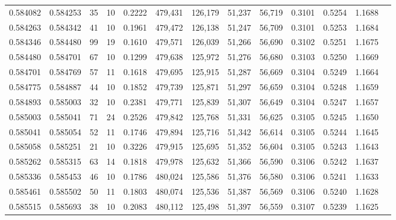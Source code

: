 \begin{tabular}{rrrrrrrrrrrrr}
0.584082 & 0.584253 &    35 &  10 &                                     0.2222 & 479,431 & 126,179 &  51,237 &  56,719 & 0.3101 & 0.5254 & 1.1688 \\
0.584263 & 0.584342 &    41 &  10 &                                     0.1961 & 479,472 & 126,138 &  51,247 &  56,709 & 0.3101 & 0.5253 & 1.1684 \\
0.584346 & 0.584480 &    99 &  19 &                                     0.1610 & 479,571 & 126,039 &  51,266 &  56,690 & 0.3102 & 0.5251 & 1.1675 \\
0.584480 & 0.584701 &    67 &  10 &                                     0.1299 & 479,638 & 125,972 &  51,276 &  56,680 & 0.3103 & 0.5250 & 1.1669 \\
0.584701 & 0.584769 &    57 &  11 &                                     0.1618 & 479,695 & 125,915 &  51,287 &  56,669 & 0.3104 & 0.5249 & 1.1664 \\
0.584775 & 0.584887 &    44 &  10 &                                     0.1852 & 479,739 & 125,871 &  51,297 &  56,659 & 0.3104 & 0.5248 & 1.1659 \\
0.584893 & 0.585003 &    32 &  10 &                                     0.2381 & 479,771 & 125,839 &  51,307 &  56,649 & 0.3104 & 0.5247 & 1.1657 \\
0.585003 & 0.585041 &    71 &  24 &                                     0.2526 & 479,842 & 125,768 &  51,331 &  56,625 & 0.3105 & 0.5245 & 1.1650 \\
0.585041 & 0.585054 &    52 &  11 &                                     0.1746 & 479,894 & 125,716 &  51,342 &  56,614 & 0.3105 & 0.5244 & 1.1645 \\
0.585058 & 0.585251 &    21 &  10 &                                     0.3226 & 479,915 & 125,695 &  51,352 &  56,604 & 0.3105 & 0.5243 & 1.1643 \\
0.585262 & 0.585315 &    63 &  14 &                                     0.1818 & 479,978 & 125,632 &  51,366 &  56,590 & 0.3106 & 0.5242 & 1.1637 \\
0.585336 & 0.585453 &    46 &  10 &                                     0.1786 & 480,024 & 125,586 &  51,376 &  56,580 & 0.3106 & 0.5241 & 1.1633 \\
0.585461 & 0.585502 &    50 &  11 &                                     0.1803 & 480,074 & 125,536 &  51,387 &  56,569 & 0.3106 & 0.5240 & 1.1628 \\
0.585515 & 0.585693 &    38 &  10 &                                     0.2083 & 480,112 & 125,498 &  51,397 &  56,559 & 0.3107 & 0.5239 & 1.1625 \\

\end{tabular}
